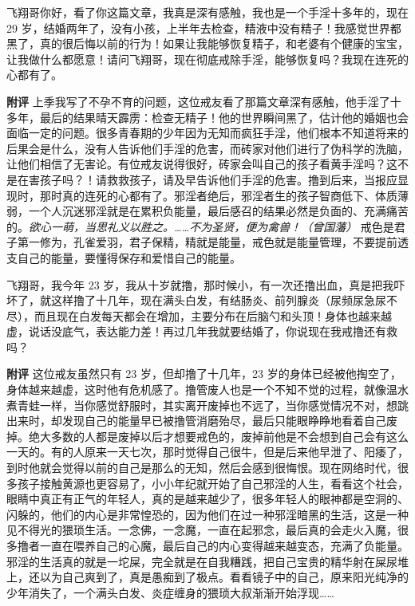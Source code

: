 \begin{case}
    飞翔哥你好，看了你这篇文章，我真是深有感触，我也是一个手淫十多年的，现在 29 岁，结婚两年了，没有小孩，上半年去检查，精液中没有精子！我感觉世界都黑了，真的很后悔以前的行为！如果让我能够恢复精子，和老婆有个健康的宝宝，让我做什么都愿意！请问飞翔哥，现在彻底戒除手淫，能够恢复吗？我现在连死的心都有了。

    \textbf{附评} 上季我写了不孕不育的问题，这位戒友看了那篇文章深有感触，他手淫了十多年，最后的结果晴天霹雳：检查无精子！他的世界瞬间黑了，估计他的婚姻也会面临一定的问题。很多青春期的少年因为无知而疯狂手淫，他们根本不知道将来的后果会是什么，没有人告诉他们手淫的危害，而砖家对他们进行了伪科学的洗脑，让他们相信了无害论。有位戒友说得很好，砖家会叫自己的孩子看黄手淫吗？这不是在害孩子吗？！请救救孩子，请及早告诉他们手淫的危害。撸到后来，当报应显现时，那时真的连死的心都有了。邪淫者绝后，邪淫者生的孩子智商低下、体质薄弱，一个人沉迷邪淫就是在累积负能量，最后感召的结果必然是负面的、充满痛苦的。\textit{欲心一萌，当思礼义以胜之。……不为圣贤，便为禽兽！（曾国藩）} 戒色是君子第一修为，孔雀爱羽，君子保精，精就是能量，戒色就是能量管理，不要提前透支自己的能量，要懂得保存和爱惜自己的能量。
\end{case}

\begin{case}
    飞翔哥，我今年 23 岁，我从十岁就撸，那时候小，有一次还撸出血，真是把我吓坏了，就这样撸了十几年，现在满头白发，有结肠炎、前列腺炎（尿频尿急尿不尽），而且现在白发每天都会在增加，主要分布在后脑勺和头顶！身体也越来越虚，说话没底气，表达能力差！再过几年我就要结婚了，你说现在我戒撸还有救吗？

    \textbf{附评} 这位戒友虽然只有 23 岁，但却撸了十几年，23 岁的身体已经被他掏空了，身体越来越虚，这时他有危机感了。撸管废人也是一个不知不觉的过程，就像温水煮青蛙一样，当你感觉舒服时，其实离开废掉也不远了，当你感觉情况不对，想跳出来时，却发现自己的能量早已被撸管消磨殆尽，最后只能眼睁睁地看着自己废掉。绝大多数的人都是废掉以后才想要戒色的，废掉前他是不会想到自己会有这么一天的。有的人原来一天七次，那时觉得自己很牛，但是后来他早泄了、阳痿了，到时他就会觉得以前的自己是那么的无知，然后会感到很悔恨。现在网络时代，很多孩子接触黄源也更容易了，小小年纪就开始了自己邪淫的人生，看看这个社会，眼睛中真正有正气的年轻人，真的是越来越少了，很多年轻人的眼神都是空洞的、闪躲的，他们的内心是非常惶恐的，因为他们在过一种邪淫暗黑的生活，这是一种见不得光的猥琐生活。一念佛，一念魔，一直在起邪念，最后真的会走火入魔，很多撸者一直在喂养自己的心魔，最后自己的内心变得越来越变态，充满了负能量。邪淫的生活真的就是一坨屎，完全就是在自我糟践，把自己宝贵的精华射在屎尿堆上，还以为自己爽到了，真是愚痴到了极点。看看镜子中的自己，原来阳光纯净的少年消失了，一个满头白发、炎症缠身的猥琐大叔渐渐开始浮现……
\end{case}

